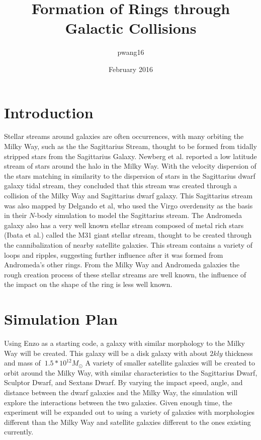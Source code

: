 \documentclass{article}
\title{Formation of Rings through Galactic Collisions}
\author{pwang16 }
\date{February 2016}
\begin{document}
\maketitle

\section{Introduction}
Stellar streams around galaxies are often occurrences, with many orbiting the Milky Way, such as the the Sagittarius Stream, thought to be formed from tidally stripped stars from the Sagittarius Galaxy. Newberg et al. reported a low latitude stream of stars around the halo in the Milky Way. With the velocity dispersion of the stars matching in similarity to the dispersion of stars in the Sagittarius dwarf galaxy tidal stream, they concluded that this stream was created through a collision of the Milky Way and Sagittarius dwarf galaxy. 
This Sagittarius stream was also mapped by Delgando et al, who used the Virgo overdensity as the basis in their $N$-body simulation to model the Sagittarius stream.
The Andromeda galaxy also has a very well known stellar stream composed of metal rich stars (Ibata et al.) called the M31 giant stellar stream, thought to be created through the cannibalization of nearby satellite galaxies. This stream contains a variety of loops and ripples, suggesting further influence after it was formed from Andromeda's other rings. From the Milky Way and Andromeda galaxies  the rough creation process of these stellar streams are well known, the influence of the impact on the shape of the ring is less well known. 

\section{Simulation Plan}
Using Enzo as a starting code, a galaxy with similar morphology to the Milky Way will be created. This galaxy will be a disk galaxy with about $2kly$ thickness and mass of $~1.5*10^{12}  M_{\odot}$ A variety of smaller satellite galaxies will be created to orbit around the Milky Way, with similar characteristics to the Sagittarius Dwarf, Sculptor Dwarf, and Sextans Dwarf. By varying the impact speed, angle, and distance between the dwarf galaxies and the Milky Way, the simulation will explore the interactions between the two galaxies. Given enough time, the experiment will be expanded out to using a variety of galaxies with morphologies different than the Milky Way and satellite galaxies different to the ones existing currently. 
\end{document}
